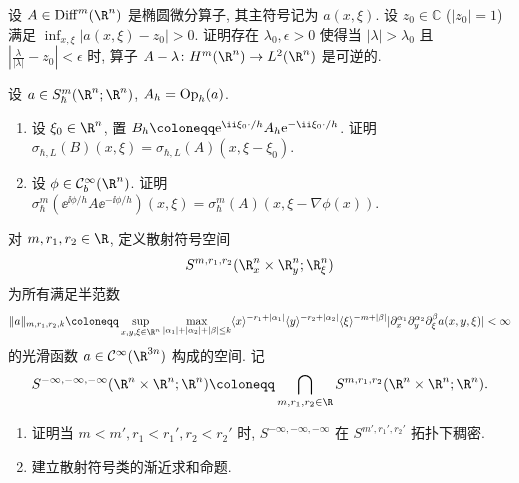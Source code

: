 \begin{exer}[高频极限下谱族的求逆, II]\label{ex:4.12}
设 $A \in \Diff^m(\R^n)$ 是椭圆微分算子, 其主符号记为 $a(x, \xi)$. 设 $z_0 \in \mathbb{C}$ ($|z_0| = 1$) 满足 $\inf_{x, \xi} |a(x, \xi) - z_0| > 0$. 证明存在 $\lambda_0, \epsilon > 0$ 使得当 $|\lambda| > \lambda_0$ 且 $\left| \frac{\lambda}{|\lambda|} - z_0 \right| < \epsilon$ 时, 算子 $A - \lambda \colon H^m(\R^n) \to L^2(\R^n)$ 是可逆的.
\end{exer}

\begin{exer}[半经典算子的共轭变换]\label{ex:4.13}
设 $a \in S_\hbar^m(\R^n; \R^n)$, $A_h = \operatorname{Op}_h(a)$.
\begin{enumerate}
    \item 设 $\xi_0 \in \R^n$, 置 $B_h \defeq \ee^{\ii \xi_0 \cdot / h} A_h \ee^{-\ii \xi_0 \cdot / h}$. 证明 $\sigma_{\hbar, L}(B)(x, \xi) = \sigma_{\hbar, L}(A)(x, \xi - \xi_0)$.
    \item 设 $\phi \in \mathcal{C}_b^\infty(\R^n)$. 证明 $\sigma_\hbar^m(\ee^{\ii \phi / h} A \ee^{-\ii \phi / h})(x, \xi) = \sigma_\hbar^m(A)(x, \xi - \nabla\phi(x))$.
\end{enumerate}
\end{exer}

\begin{exer}[散射符号类]\label{ex:4.14}
对 $m, r_1, r_2 \in \R$, 定义散射符号空间
\begin{equation}\label{eq:4.170}
    S^{m, r_1, r_2}(\R_x^n \times \R_y^n; \R_\xi^n)
\end{equation}
为所有满足半范数
\begin{equation}\label{eq:4.171}
    \|a\|_{m, r_1, r_2, k} \defeq \sup_{x, y, \xi \in \R^n} \max_{|\alpha_1| + |\alpha_2| + |\beta| \le k} \langle x \rangle^{-r_1 + |\alpha_1|} \langle y \rangle^{-r_2 + |\alpha_2|} \langle \xi \rangle^{-m + |\beta|} |\partial_x^{\alpha_1} \partial_y^{\alpha_2} \partial_\xi^\beta a(x, y, \xi)| < \infty
\end{equation}
的光滑函数 $a \in \mathcal{C}^\infty(\R^{3n})$ 构成的空间. 记
\begin{equation}\label{eq:4.172}
    S^{-\infty, -\infty, -\infty}(\R^n \times \R^n; \R^n) \defeq \bigcap_{m, r_1, r_2 \in \R} S^{m, r_1, r_2}(\R^n \times \R^n; \R^n).
\end{equation}
\begin{enumerate}
    \item 证明当 $m < m', r_1 < r_1', r_2 < r_2'$ 时, $S^{-\infty, -\infty, -\infty}$ 在 $S^{m', r_1', r_2'}$ 拓扑下稠密.
    \item 建立散射符号类的渐近求和命题.
\end{enumerate}
\end{exer}

